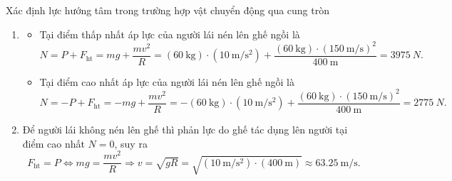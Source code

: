\begin{dang}{Xác định lực hướng tâm trong trường hợp vật chuyển động qua cung tròn}
{\begin{minipage}[l]{0.3\textwidth}
\begin{center}
		\end{center}
	\end{minipage}
		\begin{enumerate}[label=\alph*)]
			\item 
			\begin{itemize}
				\item Tại điểm thấp nhất áp lực của người lái nén lên ghế ngồi là
				\begin{equation*}
					N=P+F_{\text{ht}} = mg +\dfrac{mv^2}{R} =\left(\SI{60}{\kilogram}\right)\cdot\left(\SI{10}{\meter/\second^2}\right)+\dfrac{\left(\SI{60}{\kilogram}\right)\cdot\left(\SI{150}{\meter/\second}\right)^2}{\SI{400}{\meter}}=\SI{3975}{N}.
				\end{equation*} 
				\item Tại điểm cao nhất áp lực của người lái nén lên ghế ngồi là
				\begin{equation*}
					N=-P+F_{\text{ht}} = -mg +\dfrac{mv^2}{R} =-\left(\SI{60}{\kilogram}\right)\cdot\left(\SI{10}{\meter/\second^2}\right)+\dfrac{\left(\SI{60}{\kilogram}\right)\cdot\left(\SI{150}{\meter/\second}\right)^2}{\SI{400}{\meter}}= \SI{2775}{N}.
				\end{equation*} 
			\end{itemize}
			\item Để người lái không nén lên ghế thì phản lực do ghế tác dụng lên người tại điểm cao nhất $N=0$, suy ra 
			\begin{equation*}
				F_{\text{ht}}=P \Leftrightarrow mg = \dfrac{mv^2}{R} \Rightarrow v =\sqrt {gR} =\sqrt{\left(\SI{10}{\meter/\second^2}\right)\cdot\left(\SI{400}{\meter}\right)}\approx\SI{63.25}{\meter/\second}.
			\end{equation*}
		\end{enumerate}
	
}
\end{dang}
